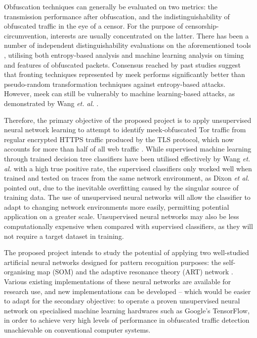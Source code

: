 \documentclass[11pt]{article}
\begin{document}
Obfuscation techniques can generally be evaluated on two metrics: the transmission performance after obfuscation, and the indistinguishability of obfuscated traffic in the eye of a censor. For the purpose of censorship-circumvention, interests are usually concentrated on the latter. There has been a number of independent distinguishability evaluations on the aforementioned tools \cite{houmansadr2013parrot} \cite{tan2015towards} \cite{wang2015seeing}, utilising both entropy-based analysis and machine learning analysis on timing and features of obfuscated packets. Consensus reached by past studies suggest that fronting techniques represented by meek performs significantly better than pseudo-random transformation techniques against entropy-based attacks. However, meek can still be vulnerably to machine learning-based attacks, as demonstrated by Wang \emph{et. al.} \cite[Sec. 6]{wang2015seeing}. 

Therefore, the primary objective of the proposed project is to apply unsupervised neural network learning to attempt to identify meek-obfuscated Tor traffic from regular encrypted HTTPS traffic produced by the TLS protocol, which now accounts for more than half of all web traffic \cite{encrypted-web}. While supervised machine learning through trained decision tree classifiers have been utilised effectively by Wang \emph{et. al.} \cite[Tb. 8]{wang2015seeing} with a high true positive rate, the supervised classifiers only worked well when trained and tested on traces from the same network environment, as Dixon \emph{et al.} \cite{dixon2016network} pointed out, due to the inevitable overfitting caused by the singular source of training data. The use of unsupervised neural networks will allow the classifier to adapt to changing network environments more easily, permitting potential application on a greater scale. Unsupervised neural networks may also be less computationally expensive when compared with supervised classifiers, as they will not require a target dataset in training.

The proposed project intends to study the potential of applying two well-studied artificial neural networks designed for pattern recognition purposes: the self-organising map (SOM) \cite{kohonen1998self} and the adaptive resonance theory (ART) network \cite{carpenter1988art}. Various existing implementations of these neural networks are available for research use, and new implementations can be developed -- which would be easier to adapt for the secondary objective: to operate a proven unsupervised neural network on specialised machine learning hardwares such as Google's TensorFlow, in order to achieve very high levels of performance in obfuscated traffic detection unachievable on conventional computer systems. 
\end{document}
